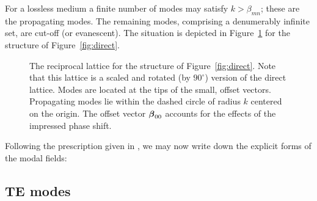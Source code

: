 For a lossless medium a finite number of modes may satisfy $k >
\beta_{mn}$; these are the propagating modes.  The remaining modes,
comprising a denumerably infinite set, are cut-off (or evanescent).
The situation is depicted in Figure~\ref{fig:reciprocal} for the
structure of Figure~\ref{fig:direct}.
\begin{figure}[tbp]
  \begin{center}
    \caption[Reciprocal lattice.]{The reciprocal lattice for the
      structure of Figure~\ref{fig:direct}.  Note that this lattice is
        a scaled and rotated (by $90^\circ$) version of the direct
        lattice. 
        Modes are located at the tips of the small, offset vectors.
        Propagating modes lie within the dashed circle of radius $k$
        centered on the origin.  The offset vector $\boldsymbol{\beta}_{00}$
        accounts for the effects of the impressed phase shift.
        }
    \label{fig:reciprocal}
  \end{center}
\end{figure}


Following the prescription given in \cite{coll:91}, we may now write
down the explicit forms of the modal fields:

\subsection{TE modes}
\label{sec:temodes}

